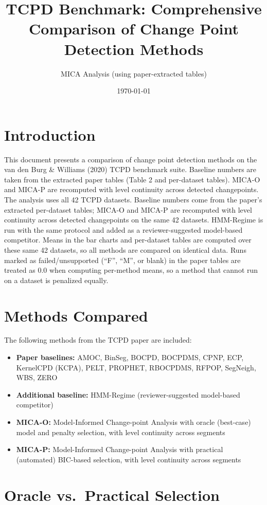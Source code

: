\documentclass[11pt,a4paper]{article}
\title{TCPD Benchmark: Comprehensive Comparison of Change Point Detection Methods}
\author{MICA Analysis (using paper-extracted tables)}
\date{\today}
\begin{document}
\maketitle

\section{Introduction}

This document presents a comparison of change point detection methods on the
van den Burg \& Williams (2020) TCPD benchmark suite. Baseline numbers are taken
from the extracted paper tables (Table 2 and per-dataset tables). MICA-O and MICA-P
are recomputed with level continuity across detected changepoints. The analysis uses all 42 TCPD datasets. Baseline numbers come from the paper's extracted per-dataset tables; MICA-O and MICA-P are recomputed with level continuity across detected changepoints on the same 42 datasets. HMM-Regime is run with the same protocol and added as a reviewer-suggested model-based competitor. Means in the bar charts and per-dataset tables are computed over these same 42 datasets, so all methods are compared on identical data. Runs marked as failed/unsupported (``F'', ``M'', or blank) in the paper tables are treated as 0.0 when computing per-method means, so a method that cannot run on a dataset is penalized equally.

\section{Methods Compared}

The following methods from the TCPD paper are included:
\begin{itemize}
    \item \textbf{Paper baselines:} AMOC, BinSeg, BOCPD, BOCPDMS, CPNP, ECP, KernelCPD (KCPA), PELT, PROPHET, RBOCPDMS, RFPOP, SegNeigh, WBS, ZERO
    \item \textbf{Additional baseline:} HMM-Regime (reviewer-suggested model-based competitor)
    \item \textbf{MICA-O:} Model-Informed Change-point Analysis with oracle (best-case) model and penalty selection, with level continuity across segments
    \item \textbf{MICA-P:} Model-Informed Change-point Analysis with practical (automated) BIC-based selection, with level continuity across segments
\end{itemize}

\section{Oracle vs.\ Practical Selection}
\end{document}
